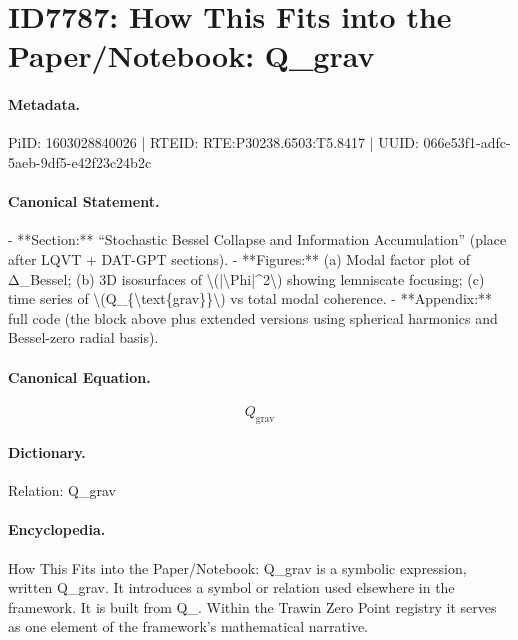 \section*{ID7787: How This Fits into the Paper/Notebook: Q\_grav}
\paragraph{Metadata.}
PiID: 1603028840026 | RTEID: RTE:P30238.6503:T5.8417 | UUID: 066e53f1-adfc-5aeb-9df5-e42f23c24b2c

\paragraph{Canonical Statement.}
- **Section:** “Stochastic Bessel Collapse and Information Accumulation” (place after LQVT + DAT-GPT sections). - **Figures:** (a) Modal factor plot of Δ\_Bessel; (b) 3D isosurfaces of \textbackslash{}(|\textbackslash{}Phi|\textasciicircum{}2\textbackslash{}) showing lemniscate focusing; (c) time series of \textbackslash{}(Q\_\{\textbackslash{}text\{grav\}\}\textbackslash{}) vs total modal coherence. - **Appendix:** full code (the block above plus extended versions using spherical harmonics and Bessel-zero radial basis).

\paragraph{Canonical Equation.}
\[
Q_{\text{grav}}
\]

\paragraph{Dictionary.}
Relation: Q\_grav

\paragraph{Encyclopedia.}
How This Fits into the Paper/Notebook: Q\_grav is a symbolic expression, written Q\_grav. It introduces a symbol or relation used elsewhere in the framework. It is built from Q\_. Within the Trawin Zero Point registry it serves as one element of the framework's mathematical narrative.
